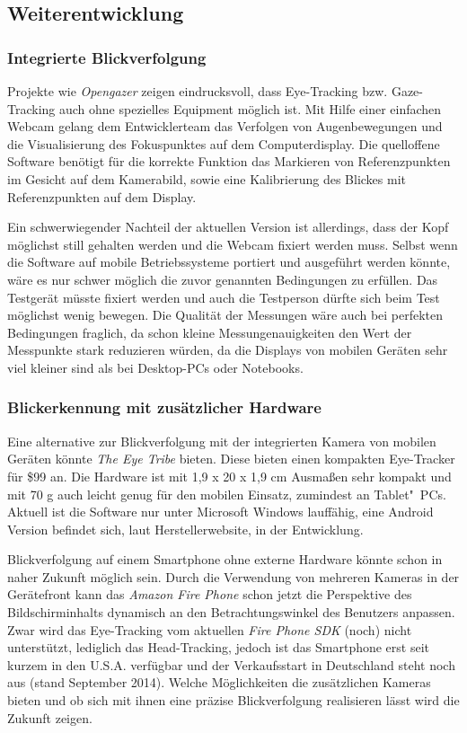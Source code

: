\subsection{Weiterentwicklung}
\subsubsection{Integrierte Blickverfolgung}
Projekte wie \emph{Opengazer} \cite{TheInferenceGroup..2009} zeigen eindrucksvoll, dass Eye-Tracking bzw. Gaze-Tracking auch ohne spezielles Equipment möglich ist.
Mit Hilfe einer einfachen Webcam gelang dem Entwicklerteam das Verfolgen von Augenbewegungen und die Visualisierung des Fokuspunktes auf dem Computerdisplay.
Die quelloffene Software benötigt für die korrekte Funktion das Markieren von Referenzpunkten im Gesicht auf dem Kamerabild, sowie eine Kalibrierung des Blickes mit Referenzpunkten auf dem Display.

Ein schwerwiegender Nachteil der aktuellen Version ist allerdings, dass der Kopf mög\-lich\-st still gehalten werden und die Webcam fixiert werden muss.
Selbst wenn die Software auf mobile Betriebssysteme portiert und ausgeführt werden könnte, wäre es nur schwer möglich die zuvor genannten Bedingungen zu erfüllen.
Das Testgerät müsste fixiert werden und auch die Testperson dürfte sich beim Test möglichst wenig bewegen.
Die Qualität der Messungen wäre auch bei perfekten Bedingungen fraglich, da schon kleine Messungenauigkeiten den Wert der Messpunkte stark reduzieren würden, da die Displays von mobilen Geräten sehr viel kleiner sind als bei Desktop-PCs oder Notebooks.

\subsubsection{Blickerkennung mit zusätzlicher Hardware}
Eine alternative zur Blickverfolgung mit der integrierten Kamera von mobilen Geräten könnte \emph{The Eye Tribe} \cite{TheEyeTribe.2014} bieten.
Diese bieten einen kompakten Eye-Tracker für \$99 an.
Die Hardware ist mit 1,9 x 20 x 1,9 cm Ausmaßen sehr kompakt und mit 70 g auch leicht genug für den mobilen Einsatz, zumindest an Tablet"~PCs.
Aktuell ist die Software nur unter Microsoft Windows lauffähig, eine Android Version befindet sich, laut Herstellerwebsite, in der Entwicklung.

Blickverfolgung auf einem Smartphone ohne externe Hardware könnte schon in naher Zukunft möglich sein.
Durch die Verwendung von mehreren Kameras in der Gerätefront kann das \emph{Amazon Fire Phone} \cite{amazon.de.2014} schon jetzt die Perspektive des Bildschirminhalts dynamisch an den Betrachtungswinkel des Benutzers anpassen.
Zwar wird das Eye-Tracking vom aktuellen \emph{Fire Phone \ac{SDK}} (noch) nicht unterstützt, lediglich das Head-Tracking, jedoch ist das Smartphone erst seit kurzem in den U.S.A. verfügbar und der Verkaufsstart in Deutschland steht noch aus (stand September 2014).
Welche Möglichkeiten die zusätzlichen Kameras bieten und ob sich mit ihnen eine präzise Blickverfolgung realisieren lässt wird die Zukunft zeigen.
